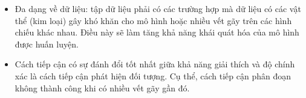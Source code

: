\documentclass[../the.tex]{subfiles}
\begin{document}
{\begin {itemize}
  \item Đa dạng về dữ liệu: tập dữ liệu phải có các trường hợp mà dữ liệu có các vật thể (kim loại) gây khó khăn cho mô hình hoặc nhiều vết gãy trên các hình chiếu khác nhau. Điều này sẽ làm tăng khả năng khái quát hóa của mô hình được huấn luyện.
 
  \item Cách tiếp cận có sự đánh đổi tốt nhất giữa khả năng giải thích và độ chính xác là cách tiếp cận phát hiện đối tượng. Cụ thể, cách tiếp cận phân đoạn không thành công khi có nhiều vết gãy gần đó.
\end {itemize}
}
\end{document}
